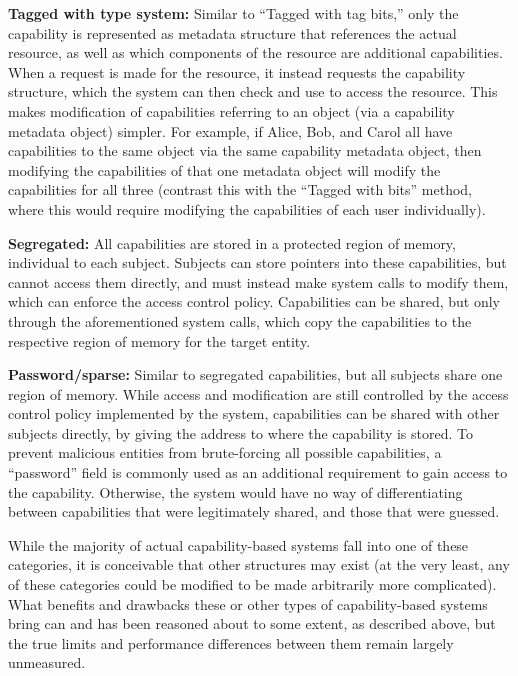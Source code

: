 {\bf Tagged with type system:} Similar to “Tagged with tag bits,” only the capability is represented as metadata structure that references the actual resource, as well as which components of the resource are additional capabilities. When a request is made for the resource, it instead requests the capability structure, which the system can then check and use to access the resource. This makes modification of capabilities referring to an object (via a capability metadata object) simpler. For example, if Alice, Bob, and Carol all have capabilities to the same object via the same capability metadata object, then modifying the capabilities of that one metadata object will modify the capabilities for all three (contrast this with the ``Tagged with bits'' method, where this would require modifying the capabilities of each user individually).

{\bf Segregated:} All capabilities are stored in a protected region of memory, individual to each subject. Subjects can store pointers into these capabilities, but cannot access them directly, and must instead make system calls to modify them, which can enforce the access control policy. Capabilities can be shared, but only through the aforementioned system calls, which copy the capabilities to the respective region of memory for the target entity.

{\bf Password/sparse:} Similar to segregated capabilities, but all subjects share one region of memory. While access and modification are still controlled by the access control policy implemented by the system, capabilities can be shared with other subjects directly, by giving the address to where the capability is stored. To prevent malicious entities from brute-forcing all possible capabilities, a “password” field is commonly used as an additional requirement to gain access to the capability. Otherwise, the system would have no way of differentiating between capabilities that were legitimately shared, and those that were guessed.

While the majority of actual capability-based systems fall into one of these categories, it is conceivable that other structures may exist (at the very least, any of these categories could be modified to be made arbitrarily more complicated). What benefits and drawbacks these or other types of capability-based systems bring can and has been reasoned about to some extent, as described above, but the true limits and performance differences between them remain largely unmeasured. 

